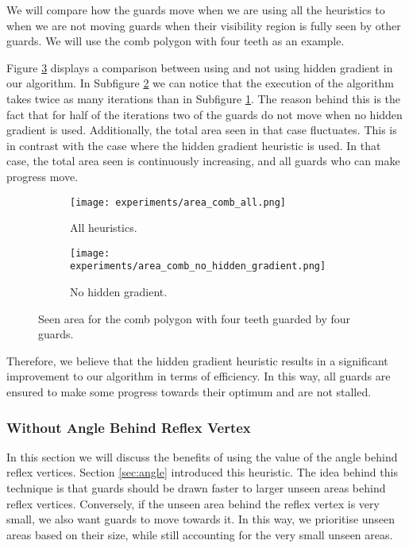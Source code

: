 We will compare how the guards move when we are using all the heuristics to when we are not moving guards when their visibility region is fully seen by other guards. We will use the comb polygon with four teeth as an example. 

Figure \ref{fig:area_no_hidden_gradient} displays a comparison between using and not using hidden gradient in our algorithm. In Subfigure \ref{fig:area_comb_no_hidden_gradient} we can notice that the execution of the algorithm takes twice as many iterations than in Subfigure \ref{fig:area_comb_all2}. The reason behind this is the fact that for half of the iterations two of the guards do not move when no hidden gradient is used. Additionally, the total area seen in that case fluctuates. This is in contrast with the case where the hidden gradient heuristic is used. In that case, the total area seen is continuously increasing, and all guards who can make progress move.

\begin{figure}[h!]
    \centering
    \begin{subfigure}{0.45\textwidth}
        \texttt{[image: experiments/area\_comb\_all.png]}
        \caption{All heuristics.}
        \label{fig:area_comb_all2}
    \end{subfigure}
    \begin{subfigure}{0.45\textwidth}
        \texttt{[image: experiments/area\_comb\_no\_hidden\_gradient.png]}
        \caption{No hidden gradient.}
        \label{fig:area_comb_no_hidden_gradient}
    \end{subfigure}
    \caption{Seen area for the comb polygon with four teeth guarded by four guards.}
    \label{fig:area_no_hidden_gradient}
\end{figure}

Therefore, we believe that the hidden gradient heuristic results in a significant improvement to our algorithm in terms of efficiency. In this way, all guards are ensured to make some progress towards their optimum and are not stalled.

\subsubsection{Without Angle Behind Reflex Vertex}
In this section we will discuss the benefits of using the value of the angle behind reflex vertices. Section \ref{sec:angle} introduced this heuristic. The idea behind this technique is that guards should be drawn faster to larger unseen areas behind reflex vertices. Conversely, if the unseen area behind the reflex vertex is very small, we also want guards to move towards it. In this way, we prioritise unseen areas based on their size, while still accounting for the very small unseen areas.

